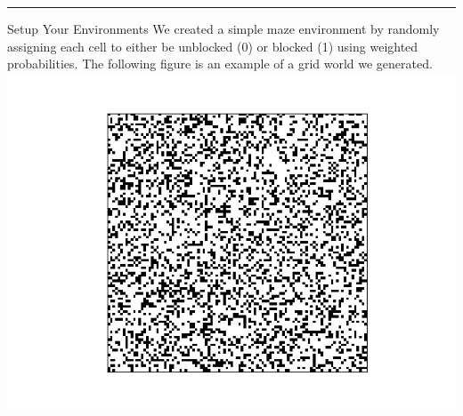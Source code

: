 \documentclass[12pt]{article}
\theoremstyle{definition}
\begin{document}
\begin{onehalfspacing}
\medskip\hrule

\begin{section}{Setup Your Environments}
We created a simple maze environment by randomly assigning each cell to either be unblocked (0) or blocked (1) using weighted probabilities. The following figure is an example of a grid world we generated.\\
\includegraphics[scale=1]{images/maze00.png}
\end{section}



\end{onehalfspacing}
\end{document}
